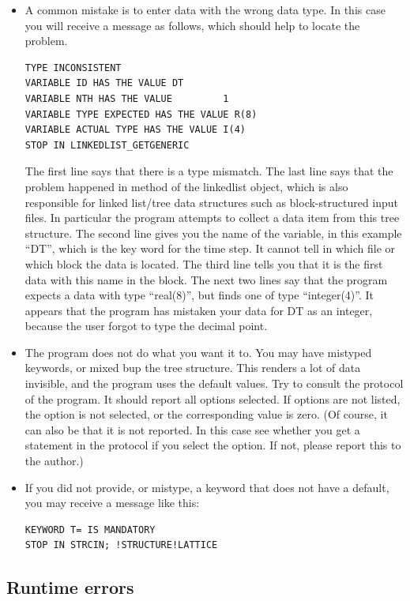 \documentclass[final,12pt]{article}
\begin{document}
{{{\begin{itemize}
\item A common mistake is to enter data with the wrong data type.
  In this case you will receive a message as follows, which should help
  to locate the problem.
\begin{verbatim}
TYPE INCONSISTENT
VARIABLE ID HAS THE VALUE DT
VARIABLE NTH HAS THE VALUE         1
VARIABLE TYPE EXPECTED HAS THE VALUE R(8)
VARIABLE ACTUAL TYPE HAS THE VALUE I(4)
STOP IN LINKEDLIST_GETGENERIC
\end{verbatim}
The first line says that there is a type mismatch. The last line
says that the problem happened in method of the linkedlist object,
which is also responsible for linked list/tree data structures such as
block-structured input files. In particular the program attempts to
collect a data item from this tree structure.  The second line gives
you the name of the variable, in this example ``DT'', which is the key
word for the time step. It cannot tell in which file or which block
the data is located. The third line tells you that it is the first
data with this name in the block. The next two lines say that the
program expects a data with type ``real(8)'', but finds one of type
``integer(4)''. It appears that the program has mistaken your data for
DT as an integer, because the user forgot to type the decimal point.
\item The program does not do what you want it to. You may have mistyped
  keywords, or mixed bup the tree structure. This renders a lot of data
  invisible, and the program uses the default values. Try to consult
  the protocol of the program. It should report all options selected.
  If options are not listed, the option is not selected, or the
  corresponding value is zero. (Of course, it can also be that it is
  not reported. In this case see whether you get a statement in the
  protocol if you select the option. If not, please report this to the
  author.)
\item If you did not provide, or mistype, a keyword that does not have
  a default, you may receive a message like this:
\begin{verbatim}
KEYWORD T= IS MANDATORY
STOP IN STRCIN; !STRUCTURE!LATTICE
\end{verbatim}

\end{itemize}

\subsection{Runtime errors}

}}}
\end{document}
